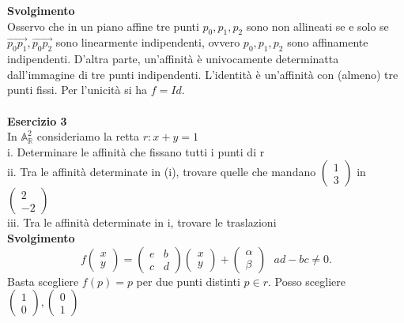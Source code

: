 \documentclass[12px]{article}
\theoremstyle{break}
\theoremstyle{break}
\theoremstyle{break}
\theoremstyle{break}
\theoremstyle{break}
\theoremstyle{break}
\newcommand{\icol}[1]{%
  \left(\begin{smallmatrix}#1\end{smallmatrix}\right)%
}
\newcommand{\matrice}[1]{%
  \begin{pmatrix}#1\end{pmatrix}%
}
\begin{document}
\textbf{Svolgimento}\\
Osservo che in un piano affine tre punti $p_0,p_1,p_2$ sono non allineati se e solo se $\overrightarrow{p_0p_1}, \overrightarrow{p_0p_2}$ sono linearmente indipendenti, ovvero $p_0,p_1,p_2$ sono affinamente indipendenti. D'altra parte, un'affinità è univocamente determinatta dall'immagine di tre punti indipendenti. L'identità è un'affinità con (almeno) tre punti fissi. Per l'unicità si ha $f=Id$.\\
\hline \ \\
\textbf{Esercizio 3} \\
In $ \mathbb{A} ^2_ \mathbb{R}$ consideriamo la retta $r: x + y =1$\\
i. Determinare le affinità che fissano tutti i punti di r\\
ii. Tra le affinità determinate in (i), trovare quelle che mandano $ \icol{1\\3} $ in $\icol{2\\-2}$\\
iii. Tra le affinità determinate in i, trovare le traslazioni\\
\textbf{Svolgimento} \\
\[
	f\matrice{x\\y} = \matrice{e & b \\ c & d}\matrice{x \\ y} + \matrice{\alpha \\ \beta} \ \ \ ad-bc\neq 0
.\] 
Basta scegliere $f(p) = p$ per due punti distinti $p\in r$. Posso scegliere $\icol{1\\0}, \icol{0\\1}$ \\
\end{document}
